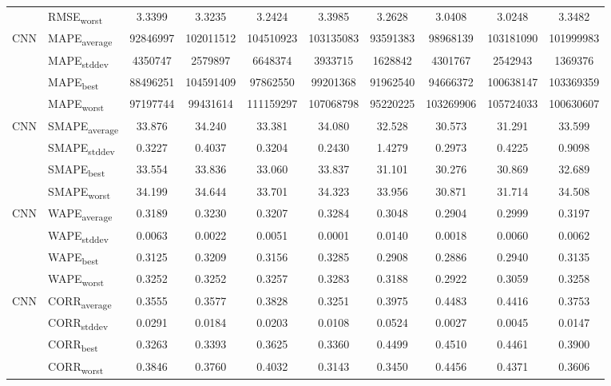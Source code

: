 {\begin{longtable}{l l c c c c c c c c}
 & RMSE\textsubscript{worst} & 3.3399 & 3.3235 & 3.2424 & 3.3985 & 3.2628 & 3.0408 & 3.0248 & 3.3482 \\
\cmidrule(lr){2-10}
\multirow{4}{*}{CNN} & MAPE\textsubscript{average} & 92846997 & 102011512 & 104510923 & 103135083 & 93591383 & 98968139 & 103181090 & 101999983 \\
 & MAPE\textsubscript{stddev} & 4350747 & 2579897 & 6648374 & 3933715 & 1628842 & 4301767 & 2542943 & 1369376 \\
 & MAPE\textsubscript{best} & 88496251 & 104591409 & 97862550 & 99201368 & 91962540 & 94666372 & 100638147 & 103369359 \\
 & MAPE\textsubscript{worst} & 97197744 & 99431614 & 111159297 & 107068798 & 95220225 & 103269906 & 105724033 & 100630607 \\
\cmidrule(lr){2-10}
\multirow{4}{*}{CNN} & SMAPE\textsubscript{average} & 33.876 & 34.240 & 33.381 & 34.080 & 32.528 & 30.573 & 31.291 & 33.599 \\
 & SMAPE\textsubscript{stddev} & 0.3227 & 0.4037 & 0.3204 & 0.2430 & 1.4279 & 0.2973 & 0.4225 & 0.9098 \\
 & SMAPE\textsubscript{best} & 33.554 & 33.836 & 33.060 & 33.837 & 31.101 & 30.276 & 30.869 & 32.689 \\
 & SMAPE\textsubscript{worst} & 34.199 & 34.644 & 33.701 & 34.323 & 33.956 & 30.871 & 31.714 & 34.508 \\
\cmidrule(lr){2-10}
\multirow{4}{*}{CNN} & WAPE\textsubscript{average} & 0.3189 & 0.3230 & 0.3207 & 0.3284 & 0.3048 & 0.2904 & 0.2999 & 0.3197 \\
 & WAPE\textsubscript{stddev} & 0.0063 & 0.0022 & 0.0051 & 0.0001 & 0.0140 & 0.0018 & 0.0060 & 0.0062 \\
 & WAPE\textsubscript{best} & 0.3125 & 0.3209 & 0.3156 & 0.3285 & 0.2908 & 0.2886 & 0.2940 & 0.3135 \\
 & WAPE\textsubscript{worst} & 0.3252 & 0.3252 & 0.3257 & 0.3283 & 0.3188 & 0.2922 & 0.3059 & 0.3258 \\
\cmidrule(lr){2-10}
\multirow{4}{*}{CNN} & CORR\textsubscript{average} & 0.3555 & 0.3577 & 0.3828 & 0.3251 & 0.3975 & 0.4483 & 0.4416 & 0.3753 \\
 & CORR\textsubscript{stddev} & 0.0291 & 0.0184 & 0.0203 & 0.0108 & 0.0524 & 0.0027 & 0.0045 & 0.0147 \\
 & CORR\textsubscript{best} & 0.3263 & 0.3393 & 0.3625 & 0.3360 & 0.4499 & 0.4510 & 0.4461 & 0.3900 \\
 & CORR\textsubscript{worst} & 0.3846 & 0.3760 & 0.4032 & 0.3143 & 0.3450 & 0.4456 & 0.4371 & 0.3606 \\

\end{longtable}}
